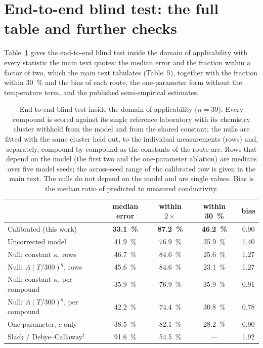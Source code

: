 \documentclass[preprint, 12pt]{elsarticle}
\begin{document}
\section{End-to-end blind test: the full table and further checks}
\label{sec:blindtable}

Table~\ref{tab:blind} gives the end-to-end blind test inside the domain of applicability with every
statistic the main text quotes: the median error and the fraction within a factor of two,
which the main text tabulates (Table~5), together with the fraction within \SI{30}{\percent} and the bias of each
route, the one-parameter form without the temperature term, and the published semi-empirical
estimates.

\begin{table}[!htbp]
  \centering
  \caption{End-to-end blind test inside the domain of applicability ($n=\num{39}$). Every compound
  is scored against its single reference laboratory with its chemistry cluster withheld from the
  model and from the shared constant; the nulls are fitted with the same cluster held out, to
  the individual measurements (rows) and, separately, compound by compound as the constants of the
  route are. Rows that
  depend on the model (the first two and the one-parameter ablation) are medians over
  five model seeds; the across-seed range of the calibrated row is given in the main text. The nulls do not depend on
  the model and are single values. Bias is the median ratio of predicted to measured conductivity.}
  \label{tab:blind}
  \small
  \setlength{\tabcolsep}{3.5pt}
  \begin{tabular}{lcccc}
    \toprule
    & median error & within $2\times$ & within \SI{30}{\percent} & bias \\
    \midrule
    Calibrated (this work)   & \textbf{\SI{33.1}{\percent}} & \textbf{\SI{87.2}{\percent}}
                             & \textbf{\SI{46.2}{\percent}} & 0.90 \\
    Uncorrected model        & \SI{41.9}{\percent} & \SI{76.9}{\percent}
                             & \SI{35.9}{\percent} & 1.40 \\
        Null: constant $\kappa$, rows  & \SI{46.7}{\percent} & \SI{84.6}{\percent}
                             & \SI{25.6}{\percent} & 1.27 \\
    Null: $A(T/300)^{q}$, rows     & \SI{45.6}{\percent} & \SI{84.6}{\percent}
                             & \SI{23.1}{\percent} & 1.27 \\
    Null: constant $\kappa$, per compound  & \SI{35.9}{\percent} & \SI{76.9}{\percent}
                             & \SI{35.9}{\percent} & 0.91 \\
    Null: $A(T/300)^{q}$, per compound     & \SI{42.2}{\percent} & \SI{74.4}{\percent}
                             & \SI{30.8}{\percent} & 0.78 \\
    \midrule
    One parameter, $c$ only  & \SI{38.5}{\percent} & \SI{82.1}{\percent} & \SI{28.2}{\percent}
                             & 0.90 \\
    Slack / Debye--Callaway$^{\dagger}$ & \SI{91.6}{\percent} & \SI{54.5}{\percent} & --- & 1.92 \\
    \bottomrule
  \end{tabular}


\end{table}
\end{document}

